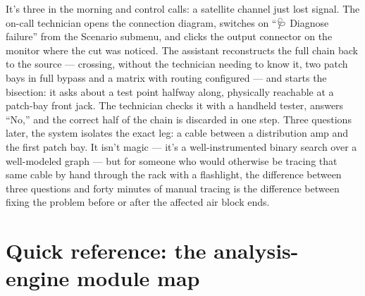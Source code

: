 \documentclass[10.4pt,twocolumn]{article}
\begin{document}
It's three in the morning and control calls: a satellite channel just lost signal. The on-call technician opens the connection diagram, switches on ``🩺 Diagnose failure'' from the Scenario submenu, and clicks the output connector on the monitor where the cut was noticed. The assistant reconstructs the full chain back to the source --- crossing, without the technician needing to know it, two patch bays in full bypass and a matrix with routing configured --- and starts the bisection: it asks about a test point halfway along, physically reachable at a patch-bay front jack. The technician checks it with a handheld tester, answers ``No,'' and the correct half of the chain is discarded in one step. Three questions later, the system isolates the exact leg: a cable between a distribution amp and the first patch bay. It isn't magic --- it's a well-instrumented binary search over a well-modeled graph --- but for someone who would otherwise be tracing that same cable by hand through the rack with a flashlight, the difference between three questions and forty minutes of manual tracing is the difference between fixing the problem before or after the affected air block ends.

\section{Quick reference: the analysis-engine module map}
\end{document}

